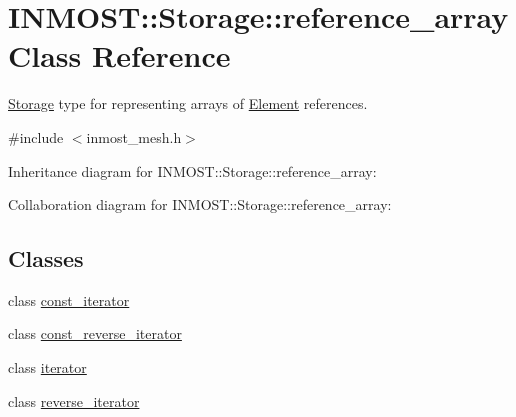 \hypertarget{classINMOST_1_1Storage_1_1reference__array}{\section{I\-N\-M\-O\-S\-T\-:\-:Storage\-:\-:reference\-\_\-array Class Reference}
\label{classINMOST_1_1Storage_1_1reference__array}
}


\hyperlink{classINMOST_1_1Storage}{Storage} type for representing arrays of \hyperlink{classINMOST_1_1Element}{Element} references.  




{\ttfamily \#include $<$inmost\-\_\-mesh.\-h$>$}



Inheritance diagram for I\-N\-M\-O\-S\-T\-:\-:Storage\-:\-:reference\-\_\-array\-:


Collaboration diagram for I\-N\-M\-O\-S\-T\-:\-:Storage\-:\-:reference\-\_\-array\-:
\subsection*{Classes}
\begin{DoxyCompactItemize}
\item 
class \hyperlink{classINMOST_1_1Storage_1_1reference__array_1_1const__iterator}{const\-\_\-iterator}
\item 
class \hyperlink{classINMOST_1_1Storage_1_1reference__array_1_1const__reverse__iterator}{const\-\_\-reverse\-\_\-iterator}
\item 
class \hyperlink{classINMOST_1_1Storage_1_1reference__array_1_1iterator}{iterator}
\item 
class \hyperlink{classINMOST_1_1Storage_1_1reference__array_1_1reverse__iterator}{reverse\-\_\-iterator}
\end{DoxyCompactItemize}

